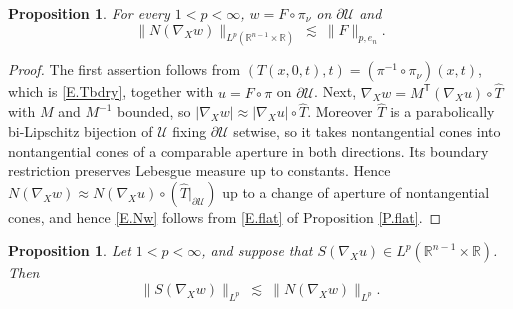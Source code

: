 \documentclass[10pt,a4paper]{amsart}
\numberwithin{equation}{section}
\newcommand{\R}{\mathbb R}
\newcommand{\abs}[1]{\left\vert#1\right\vert}
\newcommand{\br}[1]{\left(#1\right)}
\newcommand{\pd}{\partial}
\newcommand{\Uc}{\mathcal U}
\newtheorem{proposition}[equation]{Proposition}
\begin{document}
\begin{proposition}\label{P.Nw}
For every $1<p<\infty$, $w=F\circ\pi_\nu$ on $\pd\Uc$ and
\begin{equation}\label{E.Nw}
  \big\|N(\nabla_Xw)\big\|_{L^p(\R^{n-1}\times\R)}\ \lesssim\ \|F\|_{p,e_n} .
\end{equation}
\end{proposition}

\begin{proof}
The first assertion follows from
$\br{T(x,0,t),t}=\br{\pi^{-1}\circ\pi_\nu}(x,t)$, which is
\eqref{E.Tbdry}, together with $u=F\circ\pi$ on $\pd\Uc$. Next,
$\nabla_Xw=M^{\mathsf T}(\nabla_Xu)\circ\widehat T$
with $M$ and $M^{-1}$ bounded, so
$\abs{\nabla_Xw}\approx\abs{\nabla_Xu}\circ\widehat T$. Moreover $\widehat T$ is a parabolically
bi-Lipschitz bijection of $\Uc$ fixing $\pd\Uc$
setwise, so it takes nontangential cones into nontangential cones of a
comparable aperture in both directions. Its boundary restriction preserves
Lebesgue measure up to constants. Hence
$N(\nabla_Xw)\approx N(\nabla_Xu)\circ\br{\widehat T|_{\pd\Uc}}$ up to a change of
aperture of nontangential cones, and hence \eqref{E.Nw} follows from
\eqref{E.flat} of Proposition \ref{P.flat}.
\end{proof}

\begin{proposition}\label{P.Sw}
Let $1<p<\infty$, and suppose that
$S(\nabla_Xu)\in L^p(\R^{n-1}\times\R)$. Then
\begin{equation}\label{E.SNpull}
  \big\|S(\nabla_Xw)\big\|_{L^p}
  \ \lesssim\ \big\|N(\nabla_Xw)\big\|_{L^p} .
\end{equation}
\end{proposition}
\end{document}

